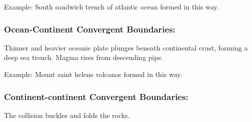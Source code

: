 \documentclass{article}
\begin{document}
\begin{multicols*}{2}
  Example: South sandwich trench of atlantic ocean formed in this way. 

  \subsubsection*{Ocean-Continent Convergent Boundaries:}
  Thinner and heavier oceanic plate plunges beneath continental crust, forming a deep sea trench. Magma rises from descending pipe.

  Example: Mount saint helens volcanos formed in this way.

  \subsubsection*{Continent-continent Convergent Boundaries:}
  The collision buckles and folds the rocks.
\end{multicols*}
\end{document}
